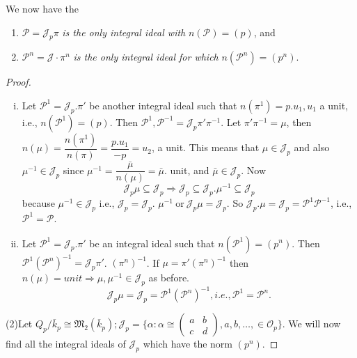 We now have the
\begin{theorem}\label{chap1:sec2:thm6} %
  \begin{enumerate}[\rm (i)]
  \item $\mathscr{P} = \mathcal{J}_p \pi$ {\em is the only integral
    ideal with }$n (\mathscr{P}) = (p)$, and  
  \item $\mathscr{P}^n = \mathcal{J} \cdot \pi^n$ {\em is the only
    integral ideal for which} $n(\mathscr{P}^n) = (p^n)$. 
  \end{enumerate}
\end{theorem}

\begin{proof}
\begin{enumerate}[(i)]
\item Let $\mathscr{P}^1 = \mathcal{J}_p.  \pi'$ be another integral
  ideal such that $n(\pi^1) = p.u_1,  u_1$ a unit, i.e.,
  $n(\mathscr{P^1}) = (p)$. Then $\mathscr{P}^1,  \mathscr{P}^{-1} =
  \mathcal{J}_p \pi' \pi^{-1}$. Let $\pi' \pi^{-1} = \mu$, then
  $n(\mu) = \dfrac{n(\pi^1)}{n(\pi)} = \dfrac{p.u_1}{-p} = u_2$, a
  unit. This means that $\mu \in \mathcal{J}_p$ and also $\mu^{-1} \in
  \mathcal{J}_p	$ since $\mu^{-1} = \dfrac{\bar{\mu}}{n(\mu)} =
  \bar{\mu}$. unit, and $\bar{\mu} \in \mathcal{J}_p$. Now  
  $$
  \mathcal{J}_p \mu \subseteq \mathcal{J}_p \Rightarrow \mathcal{J}_p \subseteq
  \mathcal{J}_p.  \mu^{-1} \subseteq \mathcal{J}_p 
  $$
  because $\mu^{-1} \in \mathcal{J}_p$ i.e., $\mathcal{J}_p =
  \mathcal{J}_p$. $\mu^{-1} ~\text{or}~ \mathcal{J}_p \mu = \mathcal{J}_p$. So
  $\mathcal{J}_p.  \mu = \mathcal{J}_p = \mathscr{P}^1
  \mathscr{P}^{-1}$, i.e., $\mathscr{P}^1 = \mathscr{P}$. 
\item Let $\mathscr{P}^1 = \mathcal{J}_p.  \pi'$ be an integral ideal
  such that $n(\mathscr{P}^1) = (p^n)$. Then $\mathscr{P}^1
  (\mathscr{P}^n)^{-1} = \mathcal{J}_p \pi'$. $(\pi^n)^{-1}$. If $\mu
  = \pi' (\pi^n)^{-1}$ then $n(\mu) = unit \Rightarrow \mu,  \mu^{-1}
  \in \mathcal{J}_p$ as before. 
  $$
  \mathcal{J}_p \mu = \mathcal{J}_p = \mathscr{P}^1
  (\mathscr{P}^n)^{-1},  i.e., \mathscr{P}^1 = \mathscr{P}^n. 
  $$
\end{enumerate}

(2)\pageoriginale \quad Let $Q_p /\bar{k}_p \cong \mathfrak{M}_2 (\bar{k}_p);
  \mathcal{J}_p = \{ \alpha : \alpha \cong \begin{pmatrix}a & b \\ c& 
    d \end{pmatrix}, a, b, \ldots,  \in \mathscr{O}_p \}$. We will now
  find all the 
  integral ideals of $\mathcal{J}_p$ which have the norm $(p^n)$. 
\end{proof}

